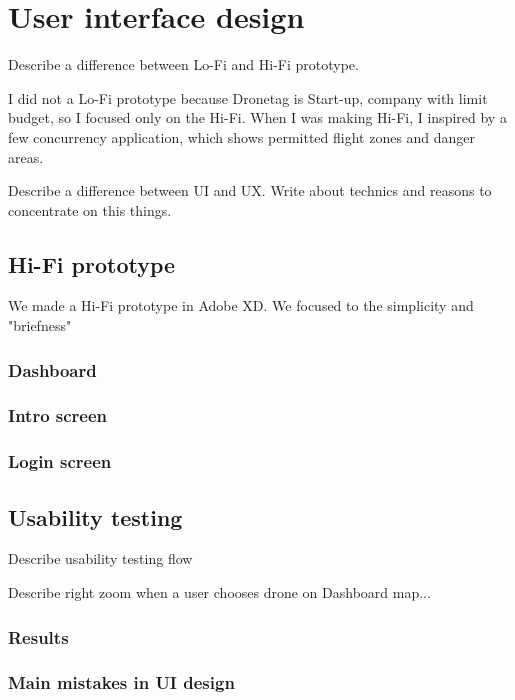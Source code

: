 \chapter{User interface design}\label{ch:user-interface-design}

Describe a difference between Lo-Fi and Hi-Fi prototype.

I did not a Lo-Fi prototype because Dronetag is Start-up, company with limit budget, so I focused only on the Hi-Fi.
When I was making Hi-Fi, I inspired by a few concurrency application, which shows permitted flight zones and danger areas.

Describe a difference between UI and UX.
Write about technics and reasons to concentrate on this things.

\section{Hi-Fi prototype}\label{sec:hi-fi-prototype}
We made a Hi-Fi prototype in Adobe XD.
We focused to the simplicity and "briefness"

\subsection{Dashboard}\label{subsec:dashboard2}

\subsection{Intro screen}\label{subsec:intro-screen}

\subsection{Login screen}\label{subsec:login-screen}

\section{Usability testing}\label{sec:usability-testing}
Describe usability testing flow

Describe right zoom when a user chooses drone on Dashboard map...

\subsection{Results}\label{subsec:results}

\subsection{Main mistakes in UI design}\label{subsec:main-mistakes-in-ui-design}